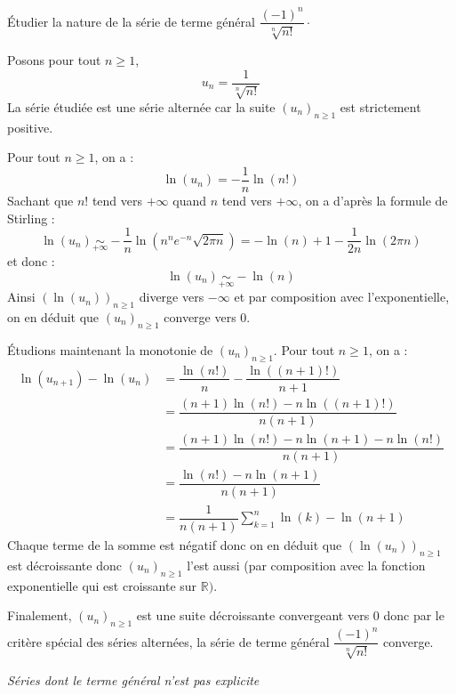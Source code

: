 \documentclass[a4paper,10pt]{report}
\begin{document}
\medskip

\begin{Exa} Étudier la nature de la série de terme général $\dfrac{(-1)^n}{\sqrt[n]{n!}} \cdot$
\end{Exa}

\corr Posons pour tout $n \geq 1$,
$$ u_n = \dfrac{1}{\sqrt[n]{n!}}$$
La série étudiée est une série alternée car la suite $(u_n)_{n \geq 1}$ est strictement positive. 

\noindent Pour tout $n \geq 1$, on a :
$$ \ln(u_n) = - \dfrac{1}{n} \ln(n!)$$
Sachant que $n!$ tend vers $+ \infty$ quand $n$ tend vers $+ \infty$, on a d'après la formule de Stirling :
$$ \ln(u_n) \underset{+ \infty}{\sim} - \dfrac{1}{n} \ln(n^n e^{-n} \sqrt{2 \pi n}) = - \ln(n) +1 - \dfrac{1}{2n} \ln(2 \pi n)$$
et donc :
$$ \ln(u_n) \underset{+ \infty}{\sim} - \ln(n)$$
Ainsi $(\ln(u_n))_{n \geq 1}$ diverge vers $- \infty$ et par composition avec l'exponentielle, on en déduit que $(u_n)_{n \geq 1}$ converge vers $0$.

\medskip

\noindent Étudions maintenant la monotonie de $(u_n)_{n \geq 1}$. Pour tout $n \geq 1$, on a :
\begin{align*}
\ln(u_{n+1})-\ln(u_n) & = \dfrac{\ln(n!)}{n} - \dfrac{\ln((n+1)!)}{n+1} \\
& = \dfrac{(n+1) \ln(n!)-n \ln((n+1)!)}{n(n+1)} \\
& = \dfrac{(n+1)\ln(n!)-n \ln(n+1)-n \ln(n!)}{n(n+1)} \\
& = \dfrac{\ln(n!)-n \ln(n+1)}{n(n+1)} \\
& = \dfrac{1}{n(n+1)} \sum_{k=1}^n \ln(k) - \ln(n+1) 
\end{align*}
Chaque terme de la somme est négatif donc on en déduit que $(\ln(u_n))_{n \geq 1}$ est décroissante donc $(u_n)_{n \geq 1}$ l'est aussi (par composition avec la fonction exponentielle qui est croissante sur $\mathbb{R})$.

\medskip

\noindent Finalement, $(u_n)_{n \geq 1}$ est une suite décroissante convergeant vers $0$ donc par le critère spécial des séries alternées, la série de terme général $\dfrac{(-1)^n}{\sqrt[n]{n!}}$ converge.

\medskip



\begin{center}
\textit{{ {\large Séries dont le terme général n'est pas explicite}}}
\end{center}
\end{document}
